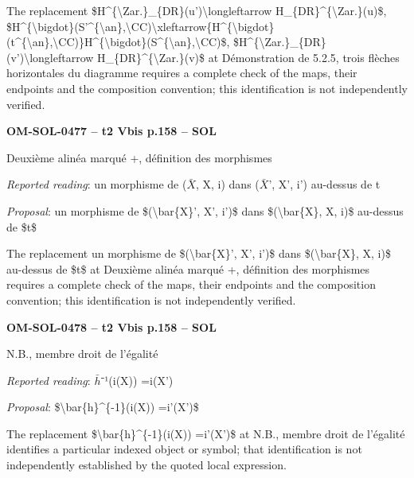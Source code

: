 The replacement \$H\textasciicircum{}\{\textbackslash{}Zar.\}\_\{DR\}(u')\textbackslash{}longleftarrow H\_\{DR\}\textasciicircum{}\{\textbackslash{}Zar.\}(u)\$, \$H\textasciicircum{}\{\textbackslash{}bigdot\}(S'\textasciicircum{}\{\textbackslash{}an\},\textbackslash{}CC)\textbackslash{}xleftarrow\{H\textasciicircum{}\{\textbackslash{}bigdot\}(t\textasciicircum{}\{\textbackslash{}an\},\textbackslash{}CC)\}H\textasciicircum{}\{\textbackslash{}bigdot\}(S\textasciicircum{}\{\textbackslash{}an\},\textbackslash{}CC)\$, \$H\textasciicircum{}\{\textbackslash{}Zar.\}\_\{DR\}(v')\textbackslash{}longleftarrow H\_\{DR\}\textasciicircum{}\{\textbackslash{}Zar.\}(v)\$ at Démonstration de 5.2.5, trois flèches horizontales du diagramme requires a complete check of the maps, their endpoints and the composition convention; this identification is not independently verified.\par
\par\noindent\textbf{OM-SOL-0477 -- t2 Vbis p.158 -- SOL}\par
Deuxième alinéa marqué +, définition des morphismes\par
\emph{Reported reading}: un morphisme de (\ensuremath{\bar{X}}, X, i) dans (\ensuremath{\bar{X}}', X', i') au-dessus de t\par
\emph{Proposal}: un morphisme de \$(\textbackslash{}bar\{X\}', X', i')\$ dans \$(\textbackslash{}bar\{X\}, X, i)\$ au-dessus de \$t\$\par
The replacement un morphisme de \$(\textbackslash{}bar\{X\}', X', i')\$ dans \$(\textbackslash{}bar\{X\}, X, i)\$ au-dessus de \$t\$ at Deuxième alinéa marqué +, définition des morphismes requires a complete check of the maps, their endpoints and the composition convention; this identification is not independently verified.\par
\par\noindent\textbf{OM-SOL-0478 -- t2 Vbis p.158 -- SOL}\par
N.B., membre droit de l'égalité\par
\emph{Reported reading}: \ensuremath{\bar{h}}⁻¹(i(X)) =\allowbreak  i(X')\par
\emph{Proposal}: \$\textbackslash{}bar\{h\}\textasciicircum{}\{-1\}(i(X)) =\allowbreak  i'(X')\$\par
The replacement \$\textbackslash{}bar\{h\}\textasciicircum{}\{-1\}(i(X)) =\allowbreak  i'(X')\$ at N.B., membre droit de l'égalité identifies a particular indexed object or symbol; that identification is not independently established by the quoted local expression.\par
